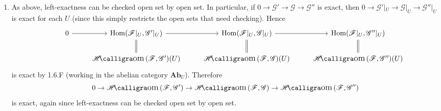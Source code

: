 \documentclass{report}
\newcommand{\cat}[1]{\mathbf{#1}} %
\newcommand{\scrF}{\mathscr{F}}
\newcommand{\scrG}{\mathscr{G}}
\DeclareMathOperator{\Hom}{Hom}
\DeclareMathOperator{\shHom}{\mathscr{H}\text{\kern -3pt {\calligra\large om}}\,}
\begin{document}
\begin{enumerate}[label=\textbf{2.6.\Alph*.}]
	\item As above, left-exactness can be checked open set by open set. In
	      particular, if $0\to\scrG'\to\scrG\to\scrG''$ is exact, then
	      $0\to\scrG'|_U\to\scrG|_U\to\scrG''|_U$ is exact for each $U$ (since this simply
	      restricts the open sets that need checking). Hence
	      \begin{equation*}
		      \begin{tikzcd}
			      &0 \arrow{r}
			      &\Hom(\scrF|_U,\scrG'|_U) \arrow{r}
			      &\Hom(\scrF|_U,\scrG|_U) \arrow{r}
			      &\Hom(\scrF|_U,\scrG''|_U) \\
			      &
			      &\shHom(\scrF,\scrG')(U) \arrow[equal]{u}
			      &\shHom(\scrF,\scrG)(U) \arrow[equal]{u}
			      &\shHom(\scrF,\scrG'')(U) \arrow[equal]{u}
		      \end{tikzcd}
	      \end{equation*}
	      is exact by 1.6.F (working in the abelian category $\cat{Ab}_U$).
	      Therefore
	      \begin{equation*}
		      0 \to \shHom(\scrF,\scrG') \to \shHom(\scrF,\scrG) \to \shHom(\scrF,\scrG'')
	      \end{equation*}
	      is exact, again since left-exactness can be checked open set by open set.


\end{enumerate}
\end{document}
